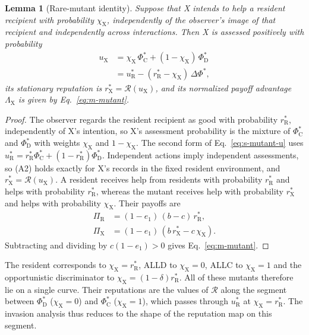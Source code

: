\documentclass[10pt]{wlscirep}
\newcommand{\Rmap}{\mathscr{R}}            %
\newcommand{\rR}{r_{\mathrm{R}}^{*}}
\newcommand{\uR}{u_{\mathrm{R}}^{*}}
\newcommand{\rX}{r_{\mathrm{X}}^{*}}
\newcommand{\uX}{u_{\mathrm{X}}}
\newcommand{\PhiCs}{\Phi^{*}_{\mathrm{C}}}
\newcommand{\PhiDs}{\Phi^{*}_{\mathrm{D}}}
\newcommand{\dPhi}{\Delta\Phi^{*}}
\theoremstyle{plain}
\newtheorem{lemma}{Lemma}
\theoremstyle{remark}
\begin{document}
\begin{lemma}[Rare-mutant identity]\label{lem:mutant}
Suppose that X intends to help a resident recipient with probability $\chi_{\mathrm X}$, independently of the observer's image of that recipient and independently across interactions. Then X is assessed positively with probability
\begin{equation}
\begin{aligned}
\uX&=\chi_{\mathrm X}\,\PhiCs+(1-\chi_{\mathrm X})\,\PhiDs\\
&=\uR-(\rR-\chi_{\mathrm X})\,\dPhi,
\end{aligned}
\label{eq:s-mutant-u}
\end{equation}
its stationary reputation is $\rX=\Rmap(\uX)$, and its normalized payoff advantage $\Lambda_{\mathrm X}$ is given by Eq.~\eqref{eq:m-mutant}.
\end{lemma}
\begin{proof}
The observer regards the resident recipient as good with probability $\rR$, independently of X's intention, so X's assessment probability is the mixture of $\PhiCs$ and $\PhiDs$ with weights $\chi_{\mathrm X}$ and $1-\chi_{\mathrm X}$. The second form of Eq.~\eqref{eq:s-mutant-u} uses $\uR=\rR\PhiCs+(1-\rR)\PhiDs$. Independent actions imply independent assessments, so (A2) holds exactly for X's records in the fixed resident environment, and $\rX=\Rmap(\uX)$. A resident receives help from residents with probability $\rR$ and helps with probability $\rR$, whereas the mutant receives help with probability $\rX$ and helps with probability $\chi_{\mathrm X}$. Their payoffs are
\begin{equation}
\begin{aligned}
\Pi_{\mathrm R}&=(1-e_1)\,(b-c)\,\rR,\\
\Pi_{\mathrm X}&=(1-e_1)\,(b\,\rX-c\,\chi_{\mathrm X}).
\end{aligned}
\label{eq:s-mutant-payoffs}
\end{equation}
Subtracting and dividing by $c(1-e_1)>0$ gives Eq.~\eqref{eq:m-mutant}.
\end{proof}

The resident corresponds to $\chi_{\mathrm X}=\rR$, ALLD to $\chi_{\mathrm X}=0$, ALLC to $\chi_{\mathrm X}=1$ and the opportunistic discriminator to $\chi_{\mathrm X}=(1-\delta)\rR$. All of these mutants therefore lie on a single curve. Their reputations are the values of $\Rmap$ along the segment between $\PhiDs$ ($\chi_{\mathrm X}=0$) and $\PhiCs$ ($\chi_{\mathrm X}=1$), which passes through $\uR$ at $\chi_{\mathrm X}=\rR$. The invasion analysis thus reduces to the shape of the reputation map on this segment.
\end{document}
